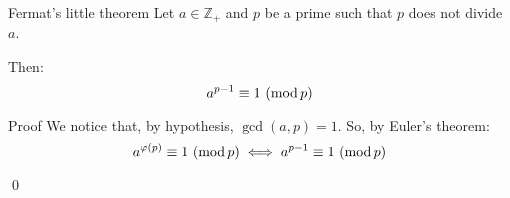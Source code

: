 \documentclass[a4paper]{article}
\begin{document}
\begin{parag}{Fermat's little theorem}
    Let $a \in \mathbb{Z}_+$ and $p$ be a prime such that $p$ does not divide $a$.

    Then: 
    \[a^{p-1} \equiv 1\ (\operatorname{mod} p)\]
    
    \begin{subparag}{Proof}
        We notice that, by hypothesis, $\gcd\left(a, p\right) = 1$. So, by Euler's theorem: 
        \[\congruent{a^{\phi\left(p\right)}}{1}{p} \iff \congruent{a^{p-1}}{1}{p}\]
        
        \qed
    \end{subparag}
\end{parag}
\end{document}
